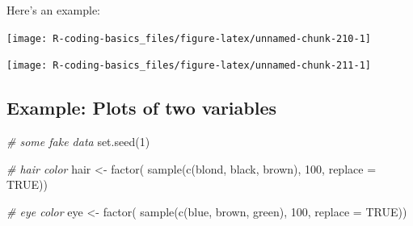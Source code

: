 \documentclass[
]{book}
\newenvironment{Shaded}{\begin{snugshade}}{\end{snugshade}}
\newcommand{\AttributeTok}[1]{\textcolor[rgb]{0.77,0.63,0.00}{#1}}
\newcommand{\CommentTok}[1]{\textcolor[rgb]{0.56,0.35,0.01}{\textit{#1}}}
\newcommand{\ConstantTok}[1]{\textcolor[rgb]{0.00,0.00,0.00}{#1}}
\newcommand{\DecValTok}[1]{\textcolor[rgb]{0.00,0.00,0.81}{#1}}
\newcommand{\FunctionTok}[1]{\textcolor[rgb]{0.00,0.00,0.00}{#1}}
\newcommand{\NormalTok}[1]{#1}
\newcommand{\OtherTok}[1]{\textcolor[rgb]{0.56,0.35,0.01}{#1}}
\newcommand{\SpecialCharTok}[1]{\textcolor[rgb]{0.00,0.00,0.00}{#1}}
\newcommand{\StringTok}[1]{\textcolor[rgb]{0.31,0.60,0.02}{#1}}
\begin{document}
Here's an example:

\begin{Shaded}
\end{Shaded}

\begin{center}\texttt{[image: R-coding-basics\_files/figure-latex/unnamed-chunk-210-1]} \end{center}

\begin{center}\texttt{[image: R-coding-basics\_files/figure-latex/unnamed-chunk-211-1]} \end{center}

\hypertarget{example-plots-of-two-variables}{%
\subsection{Example: Plots of two variables}\label{example-plots-of-two-variables}}

\begin{Shaded}
\begin{Highlighting}[]
\CommentTok{\# some fake data}
\FunctionTok{set.seed}\NormalTok{(}\DecValTok{1}\NormalTok{)}

\CommentTok{\# hair color}
\NormalTok{hair }\OtherTok{\textless{}{-}} \FunctionTok{factor}\NormalTok{(}
  \FunctionTok{sample}\NormalTok{(}\FunctionTok{c}\NormalTok{(}\StringTok{\textquotesingle{}blond\textquotesingle{}}\NormalTok{, }\StringTok{\textquotesingle{}black\textquotesingle{}}\NormalTok{, }\StringTok{\textquotesingle{}brown\textquotesingle{}}\NormalTok{), }\DecValTok{100}\NormalTok{, }\AttributeTok{replace =} \ConstantTok{TRUE}\NormalTok{))}

\CommentTok{\# eye color}
\NormalTok{eye }\OtherTok{\textless{}{-}} \FunctionTok{factor}\NormalTok{(}
  \FunctionTok{sample}\NormalTok{(}\FunctionTok{c}\NormalTok{(}\StringTok{\textquotesingle{}blue\textquotesingle{}}\NormalTok{, }\StringTok{\textquotesingle{}brown\textquotesingle{}}\NormalTok{, }\StringTok{\textquotesingle{}green\textquotesingle{}}\NormalTok{), }\DecValTok{100}\NormalTok{, }\AttributeTok{replace =} \ConstantTok{TRUE}\NormalTok{))}
\end{Highlighting}
\end{Shaded}
\end{document}
